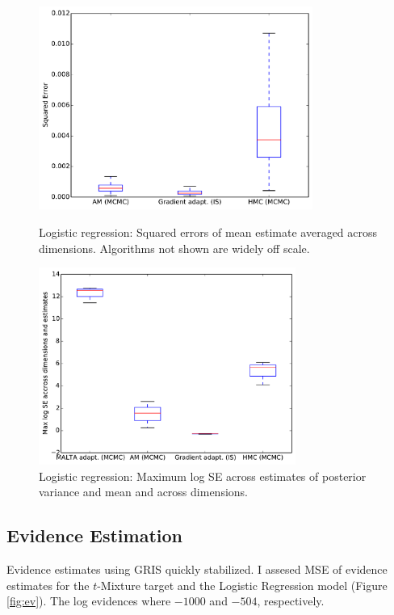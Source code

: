 \begin{figure}[tbp]
\begin{center}
\begin{minipage}[t]{0.5\textwidth}
\centering
\includegraphics[width=0.8\textwidth]{figures/gpmc_Credit_boxplot.pdf} 
\caption{Logistic regression: Squared errors of mean estimate averaged across dimensions. Algorithms not shown are widely off scale.}
\label{fig:cred_worst}
\end{minipage}\hfill
\begin{minipage}[t]{0.5\textwidth}
\centering
\includegraphics[width=0.75\textwidth]{figures/Credit_worst.pdf} 
\caption{Logistic regression: Maximum log SE across estimates of posterior variance and mean and across dimensions.} 

\label{fig:cred_worst}
\end{minipage}

\end{center}
\end{figure}

\subsection{Evidence Estimation}
Evidence estimates using GRIS quickly stabilized. I assesed MSE of evidence estimates for the $t$-Mixture target and the Logistic Regression model  (Figure \ref{fig:ev}). The log evidences where $-1000$ and $-504$, respectively.


